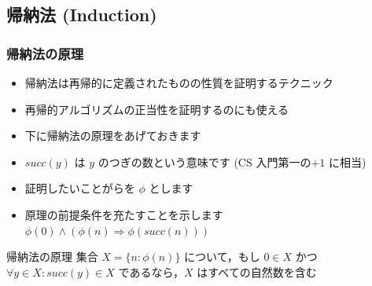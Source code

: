 \subsection{帰納法 (Induction)}
\begin{frame}[fragile]
\frametitle{帰納法の原理}
  \begin{itemize}
\item 帰納法は再帰的に定義されたものの性質を証明するテクニック
\item 再帰的アルゴリズムの正当性を証明するのにも使える
\item 下に帰納法の原理をあげておきます
\item \(\mathit{succ}(y)\) は $y$ のつぎの数という意味です (CS 入門第一の\(+1\) に相当)
\item 証明したいことがらを \(\phi\) とします
\item 原理の前提条件を充たすことを示します \(\phi(0)\wedge(\phi(n)\Rightarrow\phi(succ(n)))\)
  \end{itemize}
  \begin{block}{帰納法の原理}
集合 \(X=\{n\colon \phi(n)\}\) について，もし \(0\in X\) かつ \(\forall y\in X\colon \mathit{succ}(y)\in X\) であるなら，$X$ はすべての自然数を含む
  \end{block}
\end{frame}
